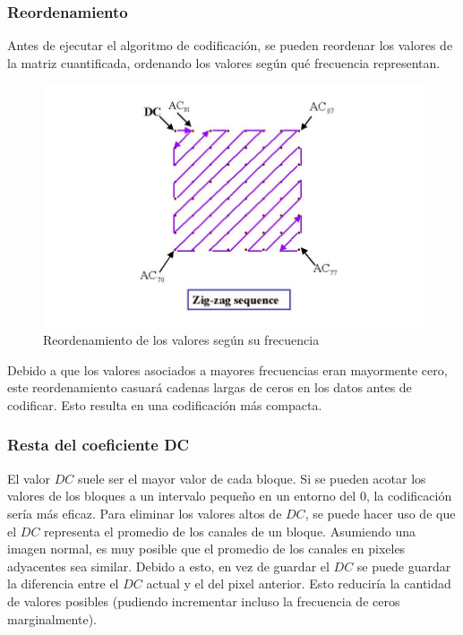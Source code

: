 \documentclass[%
	final,
	reprint,
	notitlepage,
	narroweqnarray,
	inline,
	twoside,
	invited
	]{ieee}
\begin{document}
\subsubsection{Reordenamiento}

\par Antes de ejecutar el algoritmo de codificación, se pueden reordenar los valores de la matriz cuantificada, 
ordenando los valores según qué frecuencia representan. 

\begin{figure}[H]
\centering
	\includegraphics[scale=0.7]{./img/zig-zag.jpg}
	\caption{Reordenamiento de los valores según su frecuencia}
\label{zigzag}
\end{figure}

\par Debido a que los valores asociados a mayores frecuencias eran mayormente cero, este reordenamiento casuará 
cadenas largas de ceros en los datos antes de codificar. Esto resulta en una codificación más compacta.

\subsubsection{Resta del coeficiente DC}

El valor $DC$ suele ser el mayor valor de cada bloque. Si se pueden acotar los valores de los bloques a un intervalo 
pequeño en un entorno del 0, la codificación sería más eficaz. Para eliminar los valores altos de $DC$, se puede hacer 
uso de que el $DC$ representa el promedio de los canales de un bloque. Asumiendo una imagen normal, es muy posible 
que el promedio de los canales en pixeles adyacentes sea similar. Debido a esto, en vez de guardar el $DC$ se puede 
guardar la diferencia entre el $DC$ actual y el del pixel anterior. Esto reduciría la cantidad de valores 
posibles (pudiendo incrementar incluso la frecuencia de ceros marginalmente).
\end{document}
